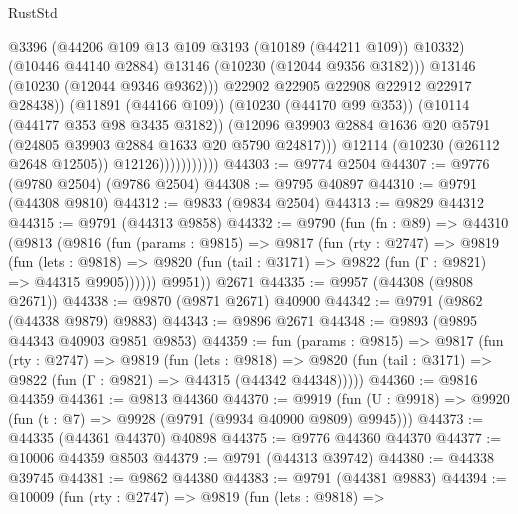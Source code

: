 \begin{lexlean}{RustStd}
\begin{coremodule}
                                    @3396
                                    (@44206 @109 @13 @109 @3193 (@10189 (@44211 @109)) @10332)
                                    (@10446 @44140 @2884)
                                    @13146
                                    (@10230 (@12044 @9356 @3182)))
                                  @13146
                                  (@10230 (@12044 @9346 @9362)))
                                @22902
                                @22905
                                @22908
                                @22912
                                @22917
                                @28438))
                            (@11891 (@44166 @109))
                            (@10230 (@44170 @99 @353))
                            (@10114 (@44177 @353 @98 @3435 @3182))
                            (@12096
                              @39903
                              @2884
                              @1636
                              @20
                              @5791
                              (@24805 @39903 @2884 @1633 @20 @5790 @24817)))
                          @12114
                          (@10230 (@26112 @2648 @12505))
                          @12126)))))))))))
@44303 := @9774 @2504
@44307 := @9776 (@9780 @2504) (@9786 @2504)
@44308 := @9795 @40897
@44310 := @9791 (@44308 @9810)
@44312 := @9833 (@9834 @2504)
@44313 := @9829 @44312
@44315 := @9791 (@44313 @9858)
@44332 := @9790
    (fun (fn : @89) =>
    @44310
      (@9813
        (@9816
          (fun (params : @9815) =>
          @9817
            (fun (rty : @2747) =>
            @9819
              (fun (lets : @9818) =>
              @9820 (fun (tail : @3171) => @9822 (fun (Γ : @9821) => @44315 @9905))))))
        @9951))
    @2671
@44335 := @9957 (@44308 (@9808 @2671))
@44338 := @9870 (@9871 @2671) @40900
@44342 := @9791 (@9862 (@44338 @9879) @9883)
@44343 := @9896 @2671
@44348 := @9893 (@9895 @44343 @40903 @9851 @9853)
@44359 := fun (params : @9815) =>
  @9817
    (fun (rty : @2747) =>
    @9819
      (fun (lets : @9818) =>
      @9820 (fun (tail : @3171) => @9822 (fun (Γ : @9821) => @44315 (@44342 @44348)))))
@44360 := @9816 @44359
@44361 := @9813 @44360
@44370 := @9919
    (fun (U : @9918) => @9920 (fun (t : @7) => @9928 (@9791 (@9934 @40900 @9809) @9945)))
@44373 := @44335 (@44361 @44370) @40898
@44375 := @9776 @44360 @44370
@44377 := @10006 @44359 @8503
@44379 := @9791 (@44313 @39742)
@44380 := @44338 @39745
@44381 := @9862 @44380
@44383 := @9791 (@44381 @9883)
@44394 := @10009
    (fun (rty : @2747) =>
    @9819
      (fun (lets : @9818) =>

\end{coremodule}
\end{lexlean}
